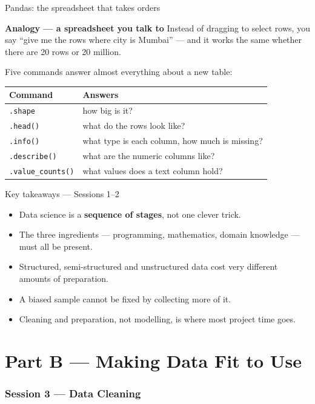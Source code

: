 \documentclass[10pt,aspectratio=169]{beamer}
\newcommand{\analogybox}[2]{%
  \begin{exampleblock}{\textbf{Analogy --- #1}}
  #2
  \end{exampleblock}%
}
\begin{document}
\begin{frame}{Pandas: the spreadsheet that takes orders}
\analogybox{a spreadsheet you talk to}{Instead of dragging to select rows, you say ``give me the rows where city is Mumbai'' --- and it works the same whether there are 20 rows or 20 million.}
\vspace{0.3cm}
Five commands answer almost everything about a new table:
\begin{table}
\small
\begin{tabularx}{\linewidth}{@{}lX@{}}
\toprule
\textbf{Command} & \textbf{Answers} \\
\midrule
\texttt{.shape} & how big is it? \\
\texttt{.head()} & what do the rows look like? \\
\texttt{.info()} & what type is each column, how much is missing? \\
\texttt{.describe()} & what are the numeric columns like? \\
\texttt{.value\_counts()} & what values does a text column hold? \\
\bottomrule
\end{tabularx}
\end{table}
\end{frame}

\begin{frame}{Key takeaways --- Sessions 1--2}
\begin{itemize}
\item Data science is a \textbf{sequence of stages}, not one clever trick.
\item The three ingredients --- programming, mathematics, domain knowledge --- must all be present.
\item Structured, semi-structured and unstructured data cost very different amounts of preparation.
\item A biased sample cannot be fixed by collecting more of it.
\item Cleaning and preparation, not modelling, is where most project time goes.
\end{itemize}
\end{frame}

\part{Part B --- Making Data Fit to Use}
\frame{\partpage}

\section{Session 3 --- Data Cleaning}
\end{document}

